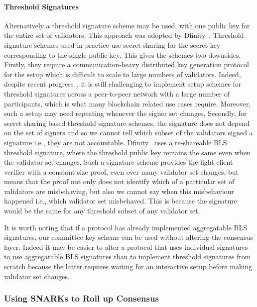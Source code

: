 \noindent \paragraph{Threshold Signatures} Alternatively a threshold signature scheme may be used, with one public key for the entire set of validators. This approach was adopted by Dfinity~\cite{GrothDKG}. Threshold signature schemes used in practice use secret sharing for the secret key corresponding to the single public key. This gives the schemes two downsides. Firstly, they require a communication-heavy distributed key generation protocol for the setup which is difficult to scale to large numbers of validators. Indeed, despite recent progress~\cite{AggregatableDKG,GrothDKG,LWEDKG}, it is still challenging to implement setup schemes for threshold signatures across a peer-to-peer network with a large number of participants, which is what many blockchain related use cases require. Moreover, such a setup may need repeating whenever the signer set changes. Secondly, for secret sharing based threshold signature schemes, the signature does not depend on the set of signers and so we cannot tell which subset of the validators signed a signature i.e., they are not accountable. Dfinity~\cite{GrothDKG} uses a re-shareable BLS threshold signature, where the threshold public key remains the same even when the validator set changes. Such a signature scheme
provides the light client verifier with a constant size proof, even over many validator set changes, but means that the proof not only does not identify which of a particular set of validators are misbehaving, but also we cannot say when this misbehaviour happened i.e., which validator set misbehaved. This is because the signature would be the same for any threshold subset of any validator set.

\noindent It is worth noting that if a protocol has already implemented aggregatable BLS signatures, our committee key scheme can be used without altering the consensus layer. Indeed it may be easier to alter a protocol that uses individual
signatures to use aggregatable BLS signatures than to implement threshold signatures from scratch because the latter requires waiting for an interactive setup before making validator set changes.

\subsubsection{Using SNARKs to Roll up Consensus}

